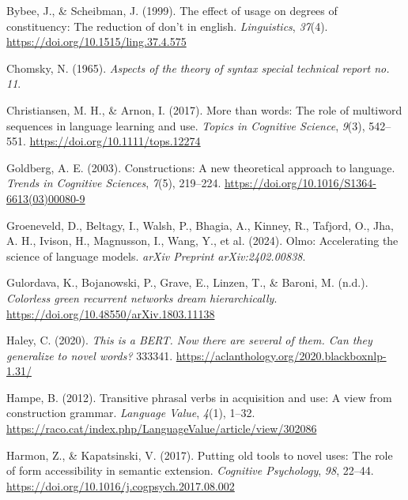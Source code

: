 \documentclass[
  12pt,
  letterpaper,
]{scrreprt}
\newlength{\cslhangindent}
\newenvironment{CSLReferences}[2] %
 {\begin{list}{}{%
  \setlength{\itemindent}{0pt}
  \setlength{\leftmargin}{0pt}
  \setlength{\parsep}{0pt}
  \ifodd #1
   \setlength{\leftmargin}{\cslhangindent}
   \setlength{\itemindent}{-1\cslhangindent}
  \fi
  \setlength{\itemsep}{#2\baselineskip}}}
 {\end{list}}
\begin{document}
\begin{CSLReferences}{1}{0}
Bybee, J., \& Scheibman, J. (1999). The effect of usage on degrees of
constituency: The reduction of don't in english. \emph{Linguistics},
\emph{37}(4). \url{https://doi.org/10.1515/ling.37.4.575}

Chomsky, N. (1965). \emph{Aspects of the theory of syntax special
technical report no. 11}.

Christiansen, M. H., \& Arnon, I. (2017). More than words: The role of
multiword sequences in language learning and use. \emph{Topics in
Cognitive Science}, \emph{9}(3), 542--551.
\url{https://doi.org/10.1111/tops.12274}

Goldberg, A. E. (2003). Constructions: A new theoretical approach to
language. \emph{Trends in Cognitive Sciences}, \emph{7}(5), 219--224.
\url{https://doi.org/10.1016/S1364-6613(03)00080-9}

Groeneveld, D., Beltagy, I., Walsh, P., Bhagia, A., Kinney, R., Tafjord,
O., Jha, A. H., Ivison, H., Magnusson, I., Wang, Y., et al. (2024).
Olmo: Accelerating the science of language models. \emph{arXiv Preprint
arXiv:2402.00838}.

Gulordava, K., Bojanowski, P., Grave, E., Linzen, T., \& Baroni, M.
(n.d.). \emph{Colorless green recurrent networks dream hierarchically}.
\url{https://doi.org/10.48550/arXiv.1803.11138}

Haley, C. (2020). \emph{This is a BERT. Now there are several of them.
Can they generalize to novel words?} 333341.
\url{https://aclanthology.org/2020.blackboxnlp-1.31/}

Hampe, B. (2012). Transitive phrasal verbs in acquisition and use: A
view from construction grammar. \emph{Language Value}, \emph{4}(1),
1--32.
\url{https://raco.cat/index.php/LanguageValue/article/view/302086}

Harmon, Z., \& Kapatsinski, V. (2017). Putting old tools to novel uses:
The role of form accessibility in semantic extension. \emph{Cognitive
Psychology}, \emph{98}, 22--44.
\url{https://doi.org/10.1016/j.cogpsych.2017.08.002}


\end{CSLReferences}
\end{document}
